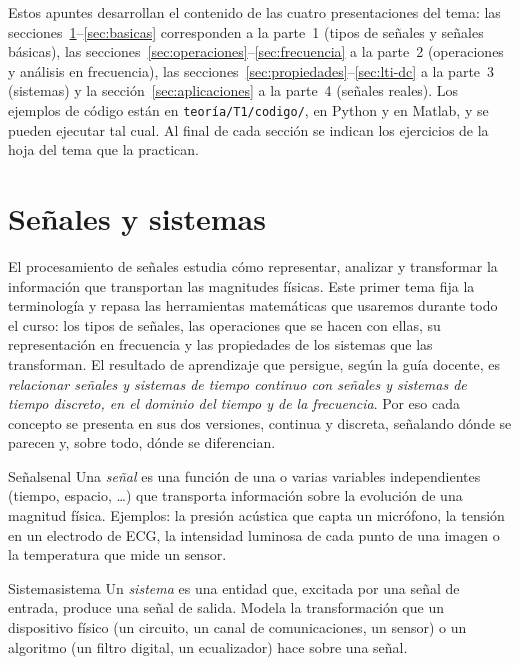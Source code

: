 \documentclass[11pt,a4paper]{scrartcl}
\begin{document}

\begin{nota}
  Estos apuntes desarrollan el contenido de las cuatro presentaciones del tema: las secciones~\ref{sec:intro}–\ref{sec:basicas} corresponden a la parte~1 (tipos de señales y señales básicas), las secciones~\ref{sec:operaciones}–\ref{sec:frecuencia} a la parte~2 (operaciones y análisis en frecuencia), las secciones~\ref{sec:propiedades}–\ref{sec:lti-dc} a la parte~3 (sistemas) y la sección~\ref{sec:aplicaciones} a la parte~4 (señales reales). Los ejemplos de código están en \texttt{teoría/T1/codigo/}, en Python y en Matlab, y se pueden ejecutar tal cual. Al final de cada sección se indican los ejercicios de la hoja del tema que la practican.
\end{nota}

\tableofcontents

\section{Señales y sistemas}\label{sec:intro}

El procesamiento de señales estudia cómo representar, analizar y transformar la información que transportan las magnitudes físicas. Este primer tema fija la terminología y repasa las herramientas matemáticas que usaremos durante todo el curso: los tipos de señales, las operaciones que se hacen con ellas, su representación en frecuencia y las propiedades de los sistemas que las transforman. El resultado de aprendizaje que persigue, según la guía docente, es \emph{relacionar señales y sistemas de tiempo continuo con señales y sistemas de tiempo discreto, en el dominio del tiempo y de la frecuencia}. Por eso cada concepto se presenta en sus dos versiones, continua y discreta, señalando dónde se parecen y, sobre todo, dónde se diferencian.

\begin{definicion}{Señal}{senal}
  Una \emph{señal} es una función de una o varias variables independientes (tiempo, espacio, \ldots) que transporta información sobre la evolución de una magnitud física. Ejemplos: la presión acústica que capta un micrófono, la tensión en un electrodo de ECG, la intensidad luminosa de cada punto de una imagen o la temperatura que mide un sensor.
\end{definicion}

\begin{definicion}{Sistema}{sistema}
  Un \emph{sistema} es una entidad que, excitada por una señal de entrada, produce una señal de salida. Modela la transformación que un dispositivo físico (un circuito, un canal de comunicaciones, un sensor) o un algoritmo (un filtro digital, un ecualizador) hace sobre una señal.
\end{definicion}
\end{document}
